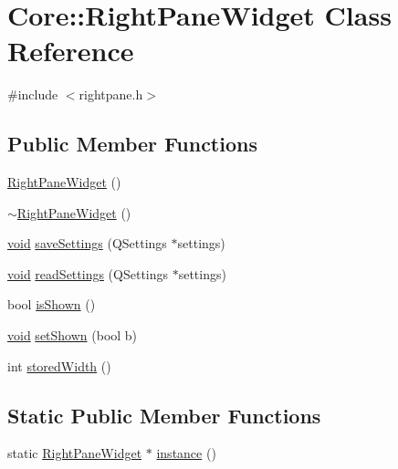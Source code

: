 \hypertarget{class_core_1_1_right_pane_widget}{\section{\-Core\-:\-:\-Right\-Pane\-Widget \-Class \-Reference}
\label{class_core_1_1_right_pane_widget}
}


{\ttfamily \#include $<$rightpane.\-h$>$}

\subsection*{\-Public \-Member \-Functions}
\begin{DoxyCompactItemize}
\item 
\hyperlink{group___core_plugin_ga2bbb7af201a89caebcb2e5471281fc2b}{\-Right\-Pane\-Widget} ()
\item 
\hyperlink{group___core_plugin_ga9cb94bea3853dcdec59955cd18d0f46e}{$\sim$\-Right\-Pane\-Widget} ()
\item 
\hyperlink{group___u_a_v_objects_plugin_ga444cf2ff3f0ecbe028adce838d373f5c}{void} \hyperlink{group___core_plugin_ga6aba4fa76241735657bafa8c91ca693a}{save\-Settings} (\-Q\-Settings $\ast$settings)
\item 
\hyperlink{group___u_a_v_objects_plugin_ga444cf2ff3f0ecbe028adce838d373f5c}{void} \hyperlink{group___core_plugin_gaf1304ad39d57b1676619c48b3cc36a2f}{read\-Settings} (\-Q\-Settings $\ast$settings)
\item 
bool \hyperlink{group___core_plugin_gaad9c682c9e0a6faa781729d99a0befd3}{is\-Shown} ()
\item 
\hyperlink{group___u_a_v_objects_plugin_ga444cf2ff3f0ecbe028adce838d373f5c}{void} \hyperlink{group___core_plugin_gae2bff06b92d12fc02f0b0dfec96172fb}{set\-Shown} (bool b)
\item 
int \hyperlink{group___core_plugin_ga4e4da9893129784bcc148d4b18d852ae}{stored\-Width} ()
\end{DoxyCompactItemize}
\subsection*{\-Static \-Public \-Member \-Functions}
\begin{DoxyCompactItemize}
\item 
static \hyperlink{class_core_1_1_right_pane_widget}{\-Right\-Pane\-Widget} $\ast$ \hyperlink{group___core_plugin_ga991b0b23f40c778845a96586009d5290}{instance} ()
\end{DoxyCompactItemize}

